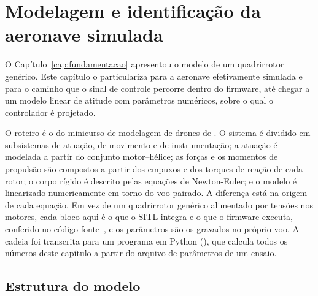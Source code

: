 %
\chapter{Modelagem e identificação da aeronave simulada}
\label{cap:modelagem}

O Capítulo~\ref{cap:fundamentacao} apresentou o modelo de um quadrirrotor
genérico. Este capítulo o particulariza para a aeronave efetivamente simulada
e para o caminho que o sinal de controle percorre dentro do firmware, até
chegar a um modelo linear de atitude com parâmetros numéricos, sobre o qual o
controlador é projetado.

O roteiro é o do minicurso de modelagem de drones de .
O sistema é dividido em subsistemas de atuação, de movimento e de
instrumentação; a atuação é modelada a partir do conjunto motor--hélice; as
forças e os momentos de propulsão são compostos a partir dos empuxos e dos
torques de reação de cada rotor; o corpo rígido é descrito pelas equações de
Newton-Euler; e o modelo é linearizado numericamente em torno do voo pairado.
A diferença está na origem de cada equação. Em vez de um quadrirrotor genérico
alimentado por tensões nos motores, cada bloco aqui é o que o SITL integra e o
que o firmware executa, conferido no código-fonte~\cite{ardupilot2026}, e os
parâmetros são os gravados no próprio voo. A cadeia foi transcrita para um
programa em Python (), que calcula todos os
números deste capítulo a partir do arquivo de parâmetros de um ensaio.

\section{Estrutura do modelo}
\label{sec:estrutura-modelo}

